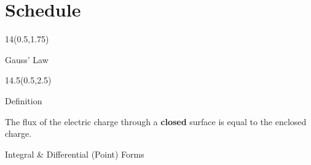 


\section{Schedule}
%	



\begin{frame}{}
\renewcommand{\arraystretch}{1}
	\begin{textblock}{14}(0.5,1.75)
	\def\myfontsize{footnotesize}
	
	\end{textblock}
\end{frame}






\begin{frame}{Gauss' Law}
\begin{textblock}{14.5}(0.5,2.5)

\begin{myblock}[0.9]{Definition}

The flux of the electric charge through a \textbf{closed} surface is equal to the enclosed charge.

\end{myblock}

\vspace{-12pt}

\begin{myblock}[0.9]{Integral \& Differential (Point) Forms}
\vspace{-12pt}
\vspace{-12pt}
\end{myblock}


\end{textblock}
\end{frame}

